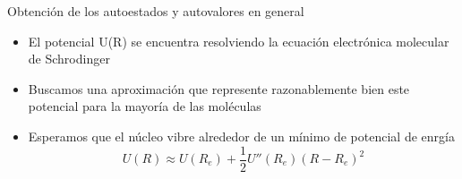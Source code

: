 \documentclass[a4paper]{beamer}
\begin{document}
\begin{frame}{Obtención de los autoestados y autovalores en general}
\begin{itemize}
\item El potencial U(R) se encuentra resolviendo la ecuación electrónica molecular de Schrodinger
\item Buscamos una aproximación que represente razonablemente bien este potencial para la mayoría de las moléculas
\item Esperamos que el núcleo vibre alrededor de un mínimo de potencial de enrgía
\begin{equation}
U(R) \approx U(R_e)+\frac{1}{2}U''(R_e)(R-R_e)^2
\end{equation}
\end{itemize}
\end{frame}
\end{document}

